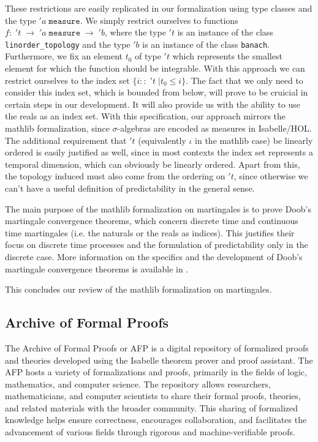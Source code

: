These restrictions are easily replicated in our formalization using type classes and the type $'a \;\texttt{measure}$. We simply restrict ourselves to functions $f : \; 't \;\rightarrow \; 'a \;\texttt{measure} \;\rightarrow\; 'b$, where the type $'t$ is an instance of the class \texttt{linorder\_topology} and the type $'b$ is an instance of the class \texttt{banach}. Furthermore, we fix an element $t_0$ of type $'t$ which represents the smallest element for which the function should be integrable. With this approach we can restrict ourselves to the index set $\{i :: \;'t \;\vert t_0 \le i\}$. The fact that we only need to consider this index set, which is bounded from below, will prove to be cruicial in certain steps in our development. It will also provide us with the ability to use the reals as an index set. With this specification, our approach mirrors the \textsf{mathlib} formalization, since $\sigma$-algebras are encoded as measures in Isabelle/HOL. The additional requirement that $'t$ (equivalently $\iota$ in the \textsf{mathlib} case) be linearly ordered is easily justified as well, since in most contexts the index set represents a temporal dimension, which can obviously be linearly ordered. Apart from this, the topology induced must also come from the ordering on $'t$, since otherwise we can't have a useful definition of predictability in the general sense.

The main purpose of the \textsf{mathlib} formalization on martingales is to prove Doob's martingale convergence theorems, which concern discrete time and continuous time martingales (i.e. the naturals or the reals as indices). This justifies their focus on discrete time processes and the formulation of predictability only in the discrete case. More information on the specifics and the development of Doob's martingale convergence theorems is available in \cite{ying2022formalization}.

This concludes our review of the \textsf{mathlib} formalization on martingales.

\subsection{Archive of Formal Proofs}

The \textsf{Archive of Formal Proofs} or \textsf{\ac{AFP}} is a digital repository of formalized proofs and theories developed using the Isabelle theorem prover and proof assistant. The \textsf{\ac{AFP}}  hosts a variety of formalizations and proofs, primarily in the fields of logic, mathematics, and computer science. The repository allows researchers, mathematicians, and computer scientists to share their formal proofs, theories, and related materials with the broader community. This sharing of formalized knowledge helps ensure correctness, encourages collaboration, and facilitates the advancement of various fields through rigorous and machine-verifiable proofs.

